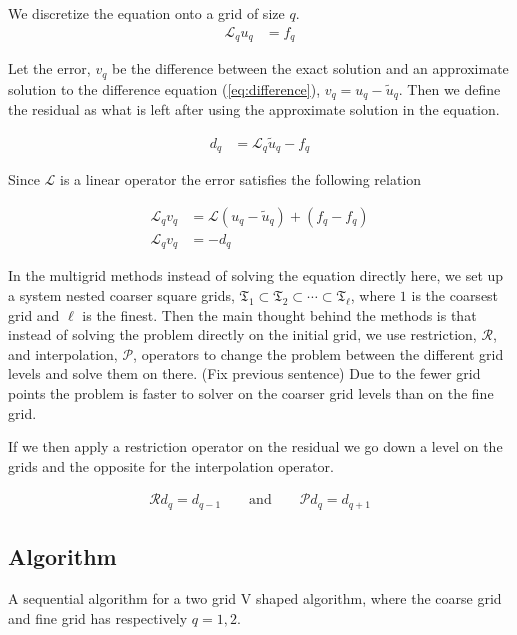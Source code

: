 	We discretize the equation onto a grid of size \(q\).
	\begin{align}
		\mathcal{L}_q u_q &= f_q \label{eq:difference}
	\end{align}

	Let the error, \(v_q\) be the difference between the exact solution and an approximate solution to the difference equation (\ref{eq:difference}), \( v_q = u_q - \tilde{u}_q \). Then we define the residual as what is left after using the approximate solution in the equation.

	\begin{align}
		d_q &= \mathcal{L}_q \tilde{u}_q - f_q
	\end{align}

	Since \(\mathcal{L}\) is a linear operator the error satisfies the following relation

	\begin{align}
		\mathcal{L}_q v_q &= \mathcal{L}(u_q - \tilde{u}_q)  + (f_q- f_q)
		\\
		\mathcal{L}_q v_q &= - d_q \label{eq:diff_MG}
	\end{align}

	In the multigrid methods instead of solving the equation directly here, we set up a system nested coarser square grids, \(\mathfrak{T}_1 \subset \mathfrak{T}_2 \subset \cdots \subset \mathfrak{T}_\ell\), where \(1\) is the coarsest grid and \(\ell\) is the finest. Then the main thought behind the methods is that instead of solving the problem directly on the initial grid, we use restriction, \( \mathcal{R} \), and interpolation, \( \mathcal{P} \), operators to change the problem between the different grid levels and solve them on there. (Fix previous sentence) Due to the fewer grid points the problem is faster to solver on the coarser grid levels than on the fine grid.

	If we then apply a restriction operator on the residual we go down a level on the grids and the opposite for the interpolation operator.

	\begin{align}
		\mathcal{R} d_q = d_{q-1} \qquad \text{and} \qquad \mathcal{P} d_q = d_{q + 1}
	\end{align}


	\subsection{Algorithm}
		A sequential algorithm for a two grid V shaped algorithm, where the coarse grid and fine grid has respectively \(q = 1,2\).

